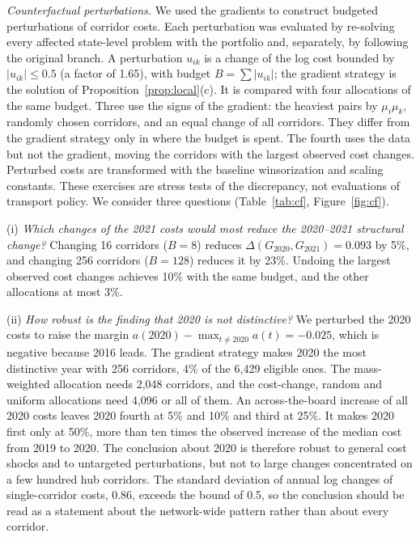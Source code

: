 \emph{Counterfactual perturbations.} We used the gradients to construct budgeted perturbations of corridor costs. Each perturbation was evaluated by re-solving every affected state-level problem with the portfolio and, separately, by following the original branch. A perturbation $u_{ik}$ is a change of the log cost bounded by $|u_{ik}|\le0.5$ (a factor of 1.65), with budget $B=\sum|u_{ik}|$; the gradient strategy is the solution of Proposition~\ref{prop:local}(c). It is compared with four allocations of the same budget. Three use the signs of the gradient: the heaviest pairs by $\mu_i\mu_k$, randomly chosen corridors, and an equal change of all corridors. They differ from the gradient strategy only in where the budget is spent. The fourth uses the data but not the gradient, moving the corridors with the largest observed cost changes. Perturbed costs are transformed with the baseline winsorization and scaling constants. These exercises are stress tests of the discrepancy, not evaluations of transport policy. We consider three questions (Table~\ref{tab:cf}, Figure~\ref{fig:cf}).

(i) \emph{Which changes of the 2021 costs would most reduce the 2020--2021 structural change?} Changing 16 corridors ($B=8$) reduces $\Delta(G_{2020},G_{2021})=0.093$ by 5\%, and changing 256 corridors ($B=128$) reduces it by 23\%. Undoing the largest observed cost changes achieves 10\% with the same budget, and the other allocations at most 3\%.

(ii) \emph{How robust is the finding that 2020 is not distinctive?} We perturbed the 2020 costs to raise the margin $a(2020)-\max_{t\neq2020}a(t)=-0.025$, which is negative because 2016 leads. The gradient strategy makes 2020 the most distinctive year with 256 corridors, 4\% of the 6{,}429 eligible ones. The mass-weighted allocation needs 2{,}048 corridors, and the cost-change, random and uniform allocations need 4{,}096 or all of them. An across-the-board increase of all 2020 costs leaves 2020 fourth at 5\% and 10\% and third at 25\%. It makes 2020 first only at 50\%, more than ten times the observed increase of the median cost from 2019 to 2020. The conclusion about 2020 is therefore robust to general cost shocks and to untargeted perturbations, but not to large changes concentrated on a few hundred hub corridors. The standard deviation of annual log changes of single-corridor costs, 0.86, exceeds the bound of 0.5, so the conclusion should be read as a statement about the network-wide pattern rather than about every corridor.

